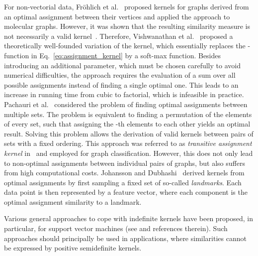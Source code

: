 \documentclass{article}
\begin{document}
For non-vectorial data, Fröhlich et al.~\cite{Frohlich2005} proposed kernels for 
graphs derived from an optimal assignment between their vertices and applied the 
approach to molecular graphs. However, it was shown that the resulting similarity
measure is not necessarily a valid kernel~\cite{Vert2008}.
Therefore, Vishwanathan et al.~\cite{Vishwanathan2010} proposed a theoretically 
well-founded variation of the kernel, which essentially replaces the 
-function in Eq.~\eqref{eq:assignment_kernel} by a soft-max function.
Besides introducing an additional parameter, which must be chosen carefully to 
avoid numerical difficulties, the approach requires the evaluation of a sum over all 
possible assignments instead of finding a single optimal one. 
This leads to an increase in running time from cubic to factorial, which is 
infeasible in practice.
Pachauri et al.~\cite{Pachauri2013} considered the problem of finding optimal assignments between 
multiple sets. The problem is equivalent to finding a permutation of the elements 
of every set, such that assigning the -th elements to each other yields an 
optimal result.
Solving this problem allows the derivation of valid kernels between pairs of sets with a
fixed ordering. This approach was referred to as \emph{transitive assignment kernel}
in~\cite{Schiavinato2015} and employed for graph classification.
However, this does not only lead to non-optimal assignments between individual 
pairs of graphs, but also suffers from high computational costs.
Johansson and Dubhashi~\cite{Johansson2015} derived kernels from 
optimal assignments by first sampling a fixed set of so-called \emph{landmarks}. 
Each data point is then represented by a feature vector, where each component is 
the optimal assignment similarity to a landmark.

Various general approaches to cope with indefinite kernels have been proposed, 
in particular, for support vector machines (see \cite{Loosli2015} and references therein).
Such approaches should principally be used in applications, where similarities 
cannot be expressed by positive semidefinite kernels.
\end{document}
